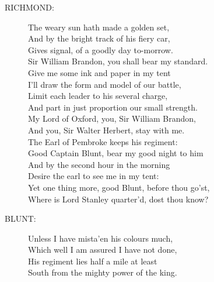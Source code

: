 \documentclass{article}
\begin{document}
\begin{description}
\item[RICHMOND:] 
\hspace{1pt}The weary sun hath made a golden set,\\
\hspace{1pt}And by the bright track of his fiery car,\\
\hspace{1pt}Gives signal, of a goodly day to-morrow.\\
\hspace{1pt}Sir William Brandon, you shall bear my standard.\\
\hspace{1pt}Give me some ink and paper in my tent\\
\hspace{1pt}I'll draw the form and model of our battle,\\
\hspace{1pt}Limit each leader to his several charge,\\
\hspace{1pt}And part in just proportion our small strength.\\
\hspace{1pt}My Lord of Oxford, you, Sir William Brandon,\\
\hspace{1pt}And you, Sir Walter Herbert, stay with me.\\
\hspace{1pt}The Earl of Pembroke keeps his regiment:\\
\hspace{1pt}Good Captain Blunt, bear my good night to him\\
\hspace{1pt}And by the second hour in the morning\\
\hspace{1pt}Desire the earl to see me in my tent:\\
\hspace{1pt}Yet one thing more, good Blunt, before thou go'st,\\
\hspace{1pt}Where is Lord Stanley quarter'd, dost thou know?\\
\end{description}
\begin{description}
\item[BLUNT:] 
\hspace{1pt}Unless I have mista'en his colours much,\\
\hspace{1pt}Which well I am assured I have not done,\\
\hspace{1pt}His regiment lies half a mile at least\\
\hspace{1pt}South from the mighty power of the king.\\
\end{description}
\end{document}
